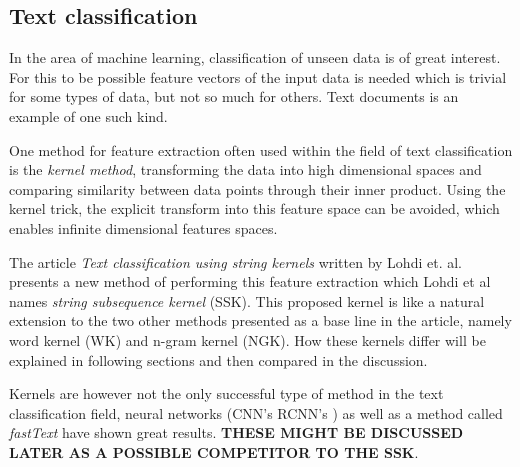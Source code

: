 \subsection{Text classification}
In the area of machine learning, classification of unseen data is of great interest. For this to be possible feature vectors of the input data is needed which is trivial for some types of data, but not so much for others. Text documents is an example of one such kind. 

One method for feature extraction often used within the field of text classification is the \textit{kernel method}, transforming the data into high dimensional spaces and comparing similarity between data points through their inner product. Using the kernel trick, the explicit transform into this feature space can be avoided, which enables infinite dimensional features spaces. 

The article \textit{Text classification using string kernels} written by Lohdi et. al. presents a new method of performing this feature extraction which Lohdi et al names \textit{string subsequence kernel} (SSK). This proposed kernel is like a natural extension to the two other methods presented as a base line in the article, namely word kernel (WK) and n-gram kernel (NGK). How these kernels differ will be explained in following sections and then compared in the discussion. 

Kernels are however not the only successful type of method in the text classification field, neural networks (CNN's RCNN's ) as well as a method called \textit{fastText} have shown great results. \textbf{THESE MIGHT BE DISCUSSED LATER AS A POSSIBLE COMPETITOR TO THE SSK}.

